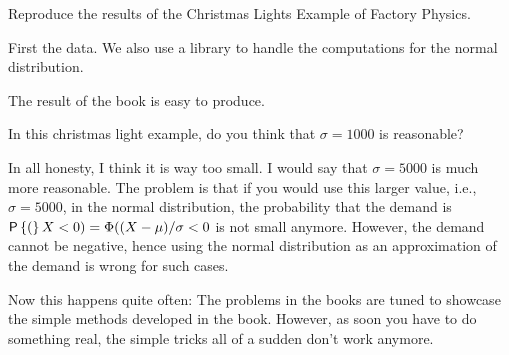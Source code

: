 \begin{question}
Reproduce the results of the Christmas Lights Example of Factory Physics.
\begin{solution}
  First the data. We also use a library to handle the computations for
  the normal distribution. 




The result of the book is easy to produce. 




\end{solution}
\end{question}

\begin{question}
  In this christmas light example, 
do you think that $\sigma = 1000$ is reasonable? 
  \begin{solution}
    In all honesty, I think it is way too small. I would say that
    $\sigma=5000$ is much more reasonable. The problem is that if you
    would use this larger value, i.e., $\sigma=5000$, in the normal
    distribution, the probability that the demand is
    $\P(X<0)=\Phi((X-\mu)/\sigma < 0$ is not small anymore. However,
    the demand cannot be negative, hence using the normal distribution
    as an approximation of the demand is wrong for such cases. 

    Now this happens quite often: The problems in the books are tuned
    to showcase the simple methods developed in the book. However, as
    soon you have to do something real, the simple tricks all of a
    sudden don't work anymore. 
  \end{solution}
\end{question}


